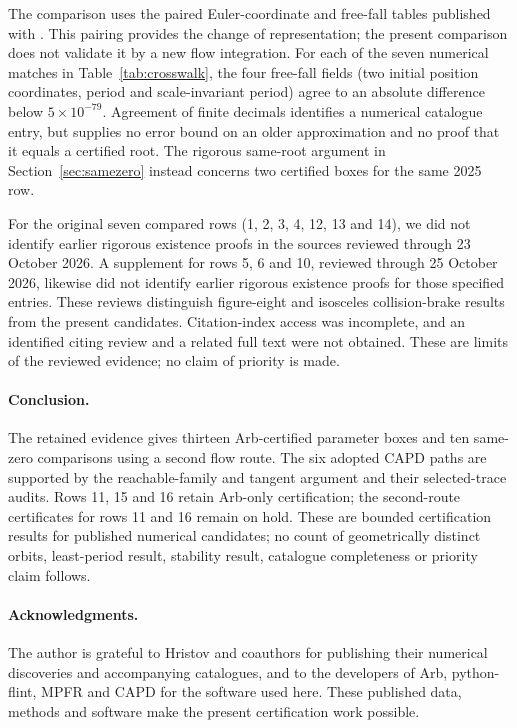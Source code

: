 \documentclass[10pt,a4paper]{article}
\theoremstyle{remark}
\begin{document}
The comparison uses the paired Euler-coordinate and free-fall tables
published with \cite{Hristov,Data}. This pairing provides the change of
representation; the present comparison does not validate it by a new
flow integration. For each of the seven numerical matches in
Table~\ref{tab:crosswalk}, the four free-fall fields (two initial position
coordinates, period and scale-invariant period) agree to an absolute
difference below $5\times10^{-79}$. Agreement of finite decimals identifies
a numerical catalogue entry, but supplies no error bound on an older
approximation and no proof that it equals a certified root. The rigorous
same-root argument in Section~\ref{sec:samezero} instead concerns two
certified boxes for the same 2025 row.

For the original seven compared rows (1, 2, 3, 4, 12, 13 and 14), we
did not identify earlier rigorous existence proofs in the sources
reviewed through 23 October 2026. A supplement for rows 5, 6 and 10,
reviewed through 25 October 2026, likewise did not identify earlier
rigorous existence proofs for those specified entries. These reviews
distinguish figure-eight and isosceles collision-brake results from the
present candidates. Citation-index access was incomplete, and an
identified citing review and a related full text were not obtained.
These are limits of the reviewed evidence; no claim of priority is made.

\paragraph{Conclusion.}
The retained evidence gives thirteen Arb-certified parameter boxes and
ten same-zero comparisons using a second flow route. The six adopted
CAPD paths are supported by the reachable-family and tangent argument
and their selected-trace audits. Rows 11, 15 and 16 retain Arb-only
certification; the second-route certificates for rows 11 and 16 remain
on hold. These are bounded certification
results for published numerical candidates; no count of geometrically
distinct orbits, least-period result, stability result, catalogue
completeness or priority claim follows.

\clearpage
\paragraph{Acknowledgments.}
The author is grateful to Hristov and coauthors for publishing their
numerical discoveries and accompanying catalogues, and to the developers
of Arb, python-flint, MPFR and CAPD for the software used here. These
published data, methods and software make the present certification work
possible.
\end{document}
